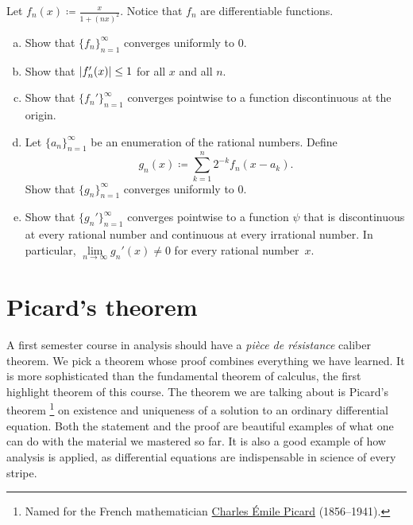 \begin{exercise}
Let $f_n(x) \coloneqq \frac{x}{1+{(nx)}^2}$.  Notice that $f_n$ are differentiable
functions.
\begin{enumerate}[a)]
\item
Show that $\{ f_n \}_{n=1}^\infty$ converges uniformly to 0.
\item
Show that $\lvert {f_n'(x)} \rvert \leq 1$ for all $x$ and all $n$.
\item
Show that $\{ f_n' \}_{n=1}^\infty$ converges pointwise to a function discontinuous at
the origin.
\item
Let $\{ a_n \}_{n=1}^\infty$ be an enumeration of the rational numbers.
Define
\begin{equation*}
g_n(x) \coloneqq \sum_{k=1}^n 2^{-k} f_n(x-a_k) .
\end{equation*}
Show that $\{ g_n \}_{n=1}^\infty$ converges uniformly to 0.
\item
Show that $\{ g_n' \}_{n=1}^\infty$ converges pointwise to a function $\psi$ that
is discontinuous at every rational number and continuous at every
irrational number.  In particular, $\lim\limits_{n\to\infty} g_n'(x) \not= 0$ for
every rational number~$x$.
\end{enumerate}
\end{exercise}


\sectionnewpage
\section{Picard's theorem}
\label{sec:picard}


A first semester course in analysis should have
a \emph{pi\`ece de r\'esistance} caliber
theorem.  We pick a theorem whose proof combines everything we have
learned.  It is more sophisticated than the fundamental theorem of calculus,
the first highlight theorem of this course.  The
theorem we are talking about is Picard's
theorem%
\footnote{Named for the French mathematician
\href{https://en.wikipedia.org/wiki/\%C3\%89mile_Picard}{Charles \'Emile Picard}
(1856--1941).}
on existence and uniqueness of a solution to an ordinary differential equation.
Both the statement and the proof are beautiful examples of what one can do
with the material we mastered so far.  It is also a good example of how analysis is
applied, as differential equations are indispensable in science of every
stripe.

